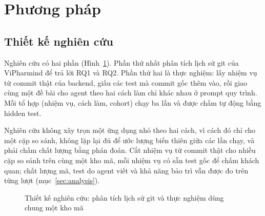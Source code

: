 \section{Phương pháp}\label{sec:method}

\subsection{Thiết kế nghiên cứu}

Nghiên cứu có hai phần (Hình~\ref{fig:design}). Phần thứ nhất phân tích lịch sử git của ViPharmind để trả lời RQ1
và RQ2. Phần thứ hai là thực nghiệm: lấy nhiệm vụ từ commit thật của backend, giấu các test mà commit gốc thêm vào, rồi
giao cùng một đề bài cho agent theo hai cách làm chỉ khác nhau ở prompt quy trình. Mỗi tổ hợp (nhiệm vụ,
cách làm, cohort) chạy ba lần và được chấm tự động bằng hidden test.

Nghiên cứu không xây trọn một ứng dụng nhỏ theo hai cách, vì cách đó chỉ cho một cặp so sánh, không lặp lại
đủ để ước lượng biến thiên giữa các lần chạy, và phải chấm chất lượng bằng phán đoán. Cắt nhiệm vụ từ commit
thật cho nhiều cặp so sánh trên cùng một kho mã, mỗi nhiệm vụ có sẵn test gốc để chấm khách quan; chất lượng
mã, test do agent viết và khả năng bảo trì vẫn được đo trên từng lượt (mục~\ref{sec:analysis}).

\begin{figure}[H]
\centering
{}
\caption{Thiết kế nghiên cứu: phân tích lịch sử git và thực nghiệm dùng chung một kho mã}\label{fig:design}
\end{figure}

